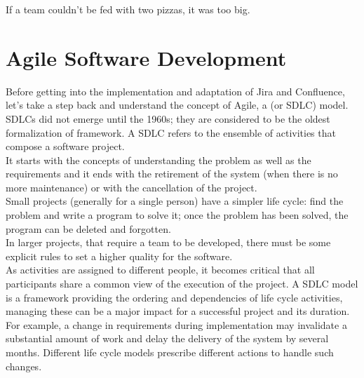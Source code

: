 \begin{savequote}[75mm]
If a team couldn’t be fed with two pizzas, it was too big.
\end{savequote}


\chapter{Agile Software Development}
\label{chapter_3}

Before getting into the implementation and adaptation of Jira and Confluence, let's take a step back and understand the concept of Agile, a  (or SDLC) model.\\
SDLCs did not emerge until the 1960s; they are considered to be the oldest formalization of \gls{framework}.
A SDLC refers to the ensemble of activities that compose a software project.\\
It starts with the concepts of understanding the problem as well as the requirements and it ends with the retirement of the system (when there is no more maintenance) or with the cancellation of the project.\\
Small projects (generally for a single person) have a simpler life cycle: find the problem and write a program to solve it; once the problem has been solved, the program can be deleted and forgotten.\\
In larger projects, that require a team to be developed, there must be some explicit rules to set a higher quality for the software.\\
As activities are assigned to different people, it becomes critical that all participants share a common view of the execution of the project.
A SDLC model is a framework providing the ordering and dependencies of life cycle activities, managing these can be a major impact for a successful project and its duration.\\
For example, a change in requirements during implementation may invalidate a substantial amount of work and delay the delivery of the system by several months.
Different life cycle models prescribe different actions to handle such changes\cite{software_lyfe_cycle}.\\
